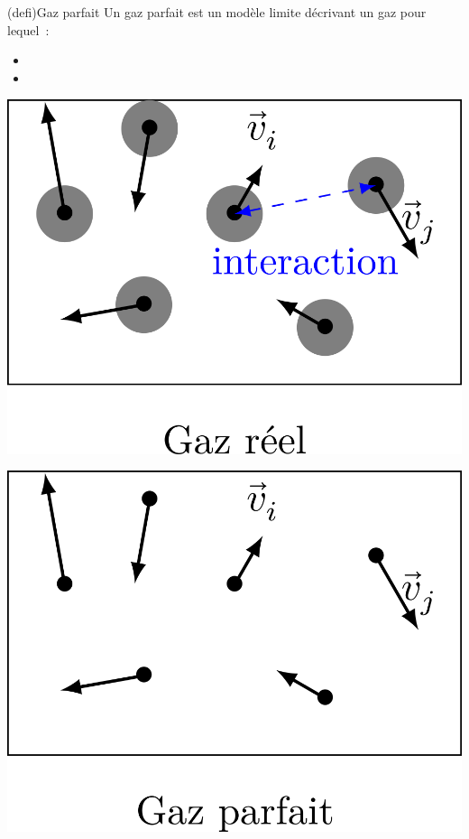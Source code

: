 \documentclass[../../main/main.tex]{subfiles}
\begin{document}
\begin{tcbraster}[raster columns=2, raster equal height=rows]
	\begin{tcb}[label=def:gp](defi){Gaz parfait}
		Un gaz parfait est un modèle limite décrivant un gaz pour lequel~:
		\begin{itemize}
			\item
			\item
		\end{itemize}
		\begin{minipage}{0.49\linewidth}
			\centering
			\includegraphics[width=\linewidth]{gaz_reel}
		\end{minipage}
		\begin{minipage}{0.49\linewidth}
			\centering
			\includegraphics[width=\linewidth]{gaz_parfait}

\end{minipage}
\end{tcb}
\end{tcbraster}
\end{document}
